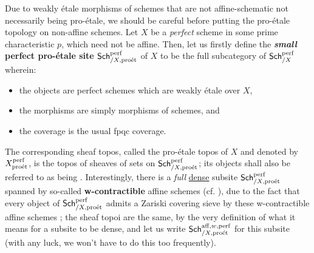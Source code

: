                 \begin{remark} \label{remark: non_affine_perfect_pro_etale_sites}
                    Due to weakly \'etale morphisms of schemes that are not affine-schematic not necessarily being pro-\'etale, we should be careful before putting the pro-\'etale topology on non-affine schemes. Let $X$ be a \textit{perfect} scheme in some prime characteristic $p$, which need not be affine. Then, let us firstly define the \textbf{\textit{small} perfect pro-\'etale site $\mathsf{Sch}_{/X, \mathrm{pro\acute{e}t}}^{\mathrm{perf}}$} of $X$ to be the full subcategory of $\mathsf{Sch}_{/X}^{\mathrm{perf}}$ wherein:
                        \begin{itemize}
                            \item the objects are perfect schemes which are weakly \'etale over $X$,
                            \item the morphisms are simply morphisms of schemes, and
                            \item the coverage is the usual fpqc coverage.
                        \end{itemize}
                    The corresponding sheaf topos, called the pro-\'etale topos of $X$ and denoted by $X^{\mathrm{perf}}_{\mathrm{pro\acute{e}t}}$, is the topos of sheaves of sets on $\mathsf{Sch}_{/X, \mathrm{pro\acute{e}t}}^{\mathrm{perf}}$; its objects shall also be referred to as being . Interestingly, there is a \textit{full} \href{https://ncatlab.org/nlab/show/dense+sub-site}{\underline{dense}} subsite $\mathsf{Sch}_{/X, \mathrm{pro\acute{e}t}}^{\mathrm{perf}}$ spanned by so-called \textbf{w-contractible} affine schemes (cf. \cite[\href{https://stacks.math.columbia.edu/tag/0980}{Tag 0980}]{stacks}), due to the fact that every object of $\mathsf{Sch}_{/X, \mathrm{pro\acute{e}t}}^{\mathrm{perf}}$ admits a Zariski covering sieve by these w-contractible affine schemes \cite[Theorem 1.5]{bhatt_scholze_2014_pro_etale}; the sheaf topoi are the same, by the very definition of what it means for a subsite to be dense, and let us write $\mathsf{Sch}_{/X, \mathrm{pro\acute{e}t}}^{\mathrm{aff}, w, \mathrm{perf}}$ for this subsite (with any luck, we won't have to do this too frequently).
                \end{remark}
                
